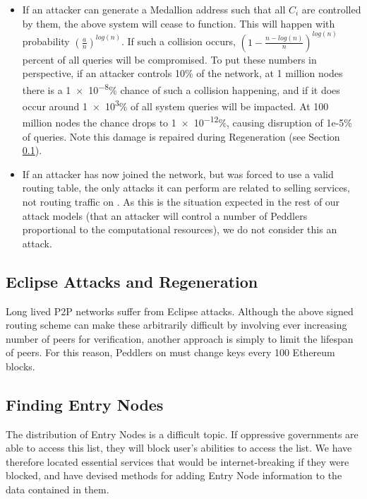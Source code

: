 \begin{itemize}
\item If an attacker can generate a Medallion address such that all $C_i$ are controlled by them, the above system will cease to function. This will happen with probability $(\frac{a}{n})^{log(n)}$. If such a collision occurs, $(1 - \frac{n-log(n)}{n})^{log(n)}$ percent of all queries will be compromised. To put these numbers in perspective, if an attacker controls 10\% of the network, at 1 million nodes there is a \num{1e-8}\% chance of such a collision happening, and if it does occur around \num{1e3}\% of all system queries will be impacted. At 100 million nodes the chance drops to \num{1e-12}\%, causing disruption of 1e-5\% of queries. Note this damage is repaired during Regeneration (see Section \ref{market-regen}).
\item If an attacker has now joined the network, but was forced to use a valid routing table, the only attacks it can perform are related to selling services, not routing traffic on \tOM{}. As this is the situation expected in the rest of our attack models (that an attacker will control a number of Peddlers proportional to the computational resources), we do not consider this an attack.
\end{itemize}

\subsection{Eclipse Attacks and Regeneration}
\label{market-regen}

Long lived P2P networks suffer from Eclipse attacks. Although the
above signed routing scheme can make these arbitrarily difficult by
involving ever increasing number of peers for verification, another
approach is simply to limit the lifespan of peers. For this reason,
Peddlers on \tOM{} must change keys every 100 Ethereum blocks.



\subsection{Finding Entry Nodes}
\label{bootstrapping}

The distribution of Entry Nodes is a difficult topic. If oppressive governments are able to access this list, they will block user's abilities to access the list. We have therefore located essential services that would be internet-breaking if they were blocked, and have devised methods for adding Entry Node information to the data contained in them.

